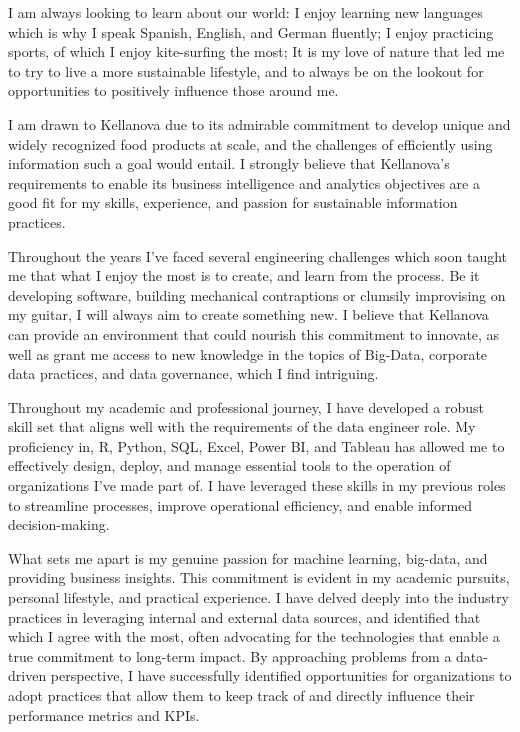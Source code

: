 \documentclass[11pt, a4paper]{awesome-cv}
\begin{document}
\begin{cvletter}
	I am always looking to learn about our world: I enjoy learning new languages which is why I speak Spanish, English, and German fluently; I enjoy practicing sports, of which I enjoy kite-surfing the most; It is my love of nature that led me to try to live a more sustainable lifestyle, and to always be on the lookout for opportunities to positively influence those around me.



	I am drawn to Kellanova due to its admirable commitment to develop unique and widely recognized food products at scale, and the challenges of efficiently using information such a goal would entail. I strongly believe that Kellanova's requirements to enable its business intelligence and analytics objectives are a good fit for my skills, experience, and passion for sustainable information practices.

	Throughout the years I've faced several engineering challenges which soon taught me that what I enjoy the most is to create, and learn from the process. Be it developing software, building mechanical contraptions or clumsily improvising on my guitar, I will always aim to create something new. I believe that Kellanova can provide an environment that could nourish this commitment to innovate, as well as grant me access to new knowledge in the topics of Big-Data, corporate data practices, and data governance, which I find intriguing.



	Throughout my academic and professional journey, I have developed a robust skill set that aligns well with the requirements of the data engineer role. My proficiency in, R, Python, SQL, Excel, Power BI, and Tableau has allowed me to effectively design, deploy, and manage essential tools to the operation of organizations I've made part of. I have leveraged these skills in my previous roles to streamline processes, improve operational efficiency, and enable informed decision-making.

	What sets me apart is my genuine passion for machine learning, big-data, and providing business insights. This commitment is evident in my academic pursuits, personal lifestyle, and practical experience. I have delved deeply into the industry practices in leveraging internal and external data sources, and identified that which I agree with the most, often advocating for the technologies that enable a true commitment to long-term impact. By approaching problems from a data-driven perspective, I have successfully identified opportunities for organizations to adopt practices that allow them to keep track of and directly influence their performance metrics and KPIs.


\end{cvletter}
\end{document}
